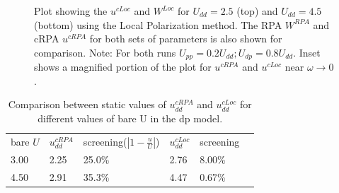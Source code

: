 \documentclass[10pt]{ruthesis}
\begin{document}
{\begin{figure}[th]
 \caption{\label{fig7}Plot showing the $u^{cLoc}$ and $W^{Loc}$ for $U_{dd}=2.5$ (top) and $U_{dd}=4.5$ (bottom) using the Local Polarization method. The RPA $W^{RPA}$ and cRPA $u^{cRPA}$ for both sets of parameters is also shown for comparison. Note: For both runs $U_{pp}=0.2U_{dd}; U_{dp}=0.8U_{dd}$. Inset shows a magnified portion of the plot for $u^{cRPA}$ and $u^{cLoc}$ near $\omega \rightarrow 0$.   }
\end{figure}



\begin{table}


\begin{tabular}{llllll}
  bare $U$ & $u^{cRPA}_{dd}$&screening($|1-\frac{u}{U}|$)&$u^{cLoc}_{dd}$&screening\\
  3.00&2.25&25.0\%&2.76&8.00\%\\
  4.50&2.91&35.3\%&4.47&0.67\%\\
\end{tabular}
\caption{\label{table1}Comparison between static values of $u^{cRPA}_{dd}$ and $u^{cLoc}_{dd}$ for different values of bare U in the dp model.}
\end{table}

}
\end{document}
